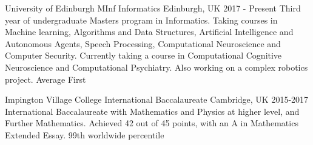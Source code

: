 

\begin{cventries}

    \cventryed
        {University of Edinburgh} %
        {MInf Informatics} %
        {Edinburgh, UK} %
        {2017 - Present} %
        {Third year of undergraduate Masters program in Informatics. \newline
        Taking courses in Machine learning, Algorithms and Data Structures, Artificial Intelligence and Autonomous Agents, Speech Processing, Computational Neuroscience and Computer Security. 
        \newline
        Currently taking a course in Computational Cognitive Neuroscience and Computational Psychiatry. Also working on a complex robotics project.}
        {Average First}
    
    \cventryed
        {Impington Village College}
        {International Baccalaureate}
        {Cambridge, UK}
        {2015-2017}
        {International Baccalaureate with Mathematics and Physics at higher level, and Further Mathematics. \newline
        Achieved 42 out of 45 points, with an A in Mathematics Extended Essay.}
        {99th worldwide percentile}
\vspace{-0.1cm}
\end{cventries}
